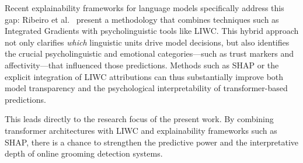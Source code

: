 Recent explainability frameworks for language models specifically address this gap: Ribeiro et al.~\cite{ribeiro2024methodologyexplainablelargelanguage} present a methodology that combines techniques such as Integrated Gradients with psycholinguistic tools like LIWC. This hybrid approach not only clarifies \emph{which} linguistic units drive model decisions, but also identifies the crucial psycholinguistic and emotional categories—such as trust markers and affectivity—that influenced those predictions. Methods such as SHAP or the explicit integration of LIWC attributions can thus substantially improve both model transparency and the psychological interpretability of transformer-based predictions. %

This leads directly to the research focus of the present work. By combining transformer architectures with LIWC and explainability frameworks such as SHAP, there is a chance to strengthen the predictive power and the interpretative depth of online grooming detection systems.
